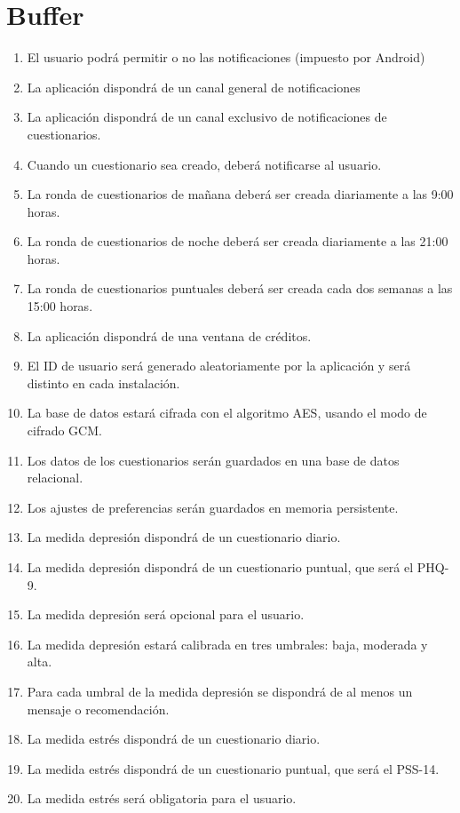 \section{Buffer}
\begin{enumerate}
    \item El usuario podrá permitir o no las notificaciones (impuesto por Android)
    \item La aplicación dispondrá de un canal general de notificaciones
    \item La aplicación dispondrá de un canal exclusivo de notificaciones de cuestionarios.
    \item Cuando un cuestionario sea creado, deberá notificarse al usuario.
    \item La ronda de cuestionarios de mañana deberá ser creada diariamente a las 9:00 horas.
    \item La ronda de cuestionarios de noche deberá ser creada diariamente a las 21:00 horas.
    \item La ronda de cuestionarios puntuales deberá ser creada cada dos semanas a las 15:00 horas.
    \item La aplicación dispondrá de una ventana de créditos.
    \item El ID de usuario será generado aleatoriamente por la aplicación y será distinto en cada instalación.
    \item La base de datos estará cifrada con el algoritmo AES, usando el modo de cifrado GCM.
    \item Los datos de los cuestionarios serán guardados en una base de datos relacional.
    \item Los ajustes de preferencias serán guardados en memoria persistente.
    \item La medida depresión dispondrá de un cuestionario diario.
    \item La medida depresión dispondrá de un cuestionario puntual, que será el PHQ-9.
    \item La medida depresión será opcional para el usuario.
    \item La medida depresión estará calibrada en tres umbrales: baja, moderada y alta.
    \item Para cada umbral de la medida depresión se dispondrá de al menos un mensaje o recomendación.
    \item La medida estrés dispondrá de un cuestionario diario.
    \item La medida estrés dispondrá de un cuestionario puntual, que será el PSS-14.
    \item La medida estrés será obligatoria para el usuario.

\end{enumerate}
